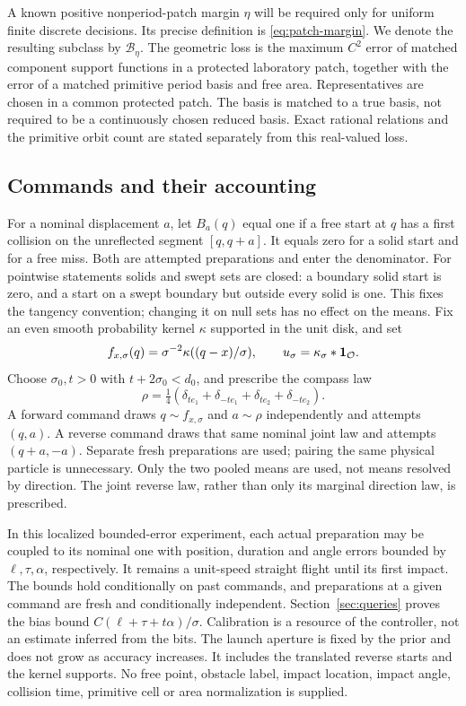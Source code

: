 A known positive nonperiod-patch margin $\eta$ will be required only
for uniform finite discrete decisions. Its precise definition is
\eqref{eq:patch-margin}. We denote the resulting subclass by
$\mathcal B_\eta$. The geometric loss is the maximum $C^2$ error of
matched component support functions in a protected laboratory patch,
together with the error of a matched primitive period basis and free
area. Representatives are chosen in a common protected patch. The
basis is matched to a true basis, not required to be a continuously
chosen reduced basis. Exact rational relations and the primitive orbit
count are stated separately from this real-valued loss.

\subsection{Commands and their accounting}
For a nominal displacement $a$, let $B_a(q)$ equal one if a free start
at $q$ has a first collision on the unreflected segment $[q,q+a]$.
It equals zero for a solid start and for a free miss. Both are attempted
preparations and enter the denominator. For pointwise statements solids
and swept sets are closed: a boundary solid start is zero, and a start
on a swept boundary but outside every solid is one. This fixes the
tangency convention; changing it on null sets has no effect on the means.
Fix an even smooth probability kernel $\kappa$ supported in the unit disk,
and set
\[
 f_{x,\sigma}(q)=\sigma^{-2}\kappa((q-x)/\sigma),\qquad
 u_\sigma=\kappa_\sigma*\mathbf 1_\mathcal O.
\]
Choose $\sigma_0,t>0$ with $t+2\sigma_0<d_0$, and prescribe the compass
law
\begin{equation}\label{eq:compass}
 \rho=\tfrac14(\delta_{te_1}+\delta_{-te_1}
                         +\delta_{te_2}+\delta_{-te_2}).
\end{equation}
A forward command draws $q\sim f_{x,\sigma}$ and $a\sim\rho$
independently and attempts $(q,a)$. A reverse command draws that same
nominal joint law and attempts $(q+a,-a).$ Separate fresh preparations
are used; pairing the same physical particle is unnecessary. Only the
two pooled means are used, not means resolved by direction. The joint
reverse law, rather than only its marginal direction law, is prescribed.

In this localized bounded-error experiment, each actual preparation may be coupled to its nominal one with position,
duration and angle errors bounded by $\ell,\tau,\alpha$, respectively.
It remains a unit-speed straight flight until its first impact. The
bounds hold conditionally on past commands, and preparations at a given
command are fresh and conditionally independent. Section~\ref{sec:queries}
proves the bias bound $C(\ell+\tau+t\alpha)/\sigma$. Calibration is a
resource of the controller, not an estimate inferred from the bits.
The launch aperture is fixed by the prior and does not grow as accuracy
increases. It includes the translated reverse starts and the kernel
supports. No free point, obstacle label, impact location, impact angle,
collision time, primitive cell or area normalization is supplied.
